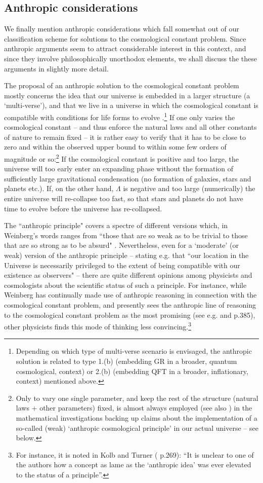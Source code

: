 \documentclass[12pt]{article}
\def\ss{\subsection}
\begin{document}
\ss{Anthropic considerations}

We finally mention anthropic considerations which fall somewhat
out of our classification scheme for solutions to the cosmological
constant problem. Since anthropic arguments seem to attract
considerable interest in this context, and since they involve
philosophically unorthodox elements, we shall discuss the these
arguments in slightly more detail. 

The proposal of an anthropic solution to the cosmological constant
problem mostly concerns the idea that our universe is embedded in
a larger structure (a `multi-verse'), and that we live in a
universe in which the cosmological constant is compatible with
conditions for life forms to evolve
\cite{Weinberg89,weinberg96b}.\footnote{Depending on which type of
multi-verse scenario is envisaged, the anthropic solution is
related to type 1.(b) (embedding GR in a broader, quantum
cosmological, context) or 2.(b) (embedding QFT in a broader,
inflationary, context) mentioned above.} If one only varies the
cosmological constant -- and thus enforce the natural laws and all
other constants of nature to remain fixed -- it is rather easy to
verify that it has to be close to zero and within the observed
upper bound to within some few orders of magnitude or
so:\footnote{Only to vary one single parameter, and keep the rest
of the structure (natural laws + other parameters) fixed, is
almost always employed (see also \cite{nielsenrugh}) in the
mathematical investigations backing up claims about the
implementation of a so-called (weak) `anthropic cosmological
principle' in our actual universe -- see below.} If the
cosmological constant is positive and too large, the universe will
too early enter an expanding phase without the formation of
sufficiently large gravitational condensation (no formation of
galaxies, stars and planets etc.). If, on the other hand,
$\Lambda$ is negative and too large (numerically) the entire
universe will re-collapse too fast, so that stars and planets do
not have time to evolve before the universe has re-collapsed.

The ``anthropic principle" covers a spectre of different versions
which, in Weinberg's words ranges from ``those that are so weak as
to be trivial to those that are so strong as to be absurd"
\cite{Weinberg89}. Nevertheless, even for a `moderate' (or weak)
version of the anthropic principle -- stating e.g. that ``our
location in the Universe is necessarily privileged to the extent
of being compatible with our existence as observers"
\cite{carter74} -- there are quite different opinions among
physicists and cosmologists about the scientific status of such a
principle. For instance, while Weinberg has continually made use
of anthropic reasoning in connection with the cosmological
constant problem, and presently sees the anthropic line of
reasoning to the cosmological constant problem as the most
promising (see e.g. \cite{weinberg96b} and \cite{cao99} p.385),
other physicists finds this mode of thinking less
convincing.\footnote{For instance, it is noted in Kolb and Turner
(\cite{kolb93} p.269): ``It is unclear to one of the authors how a
concept as lame as the `anthropic idea' was ever elevated to the
status of a principle''.}
\end{document}
